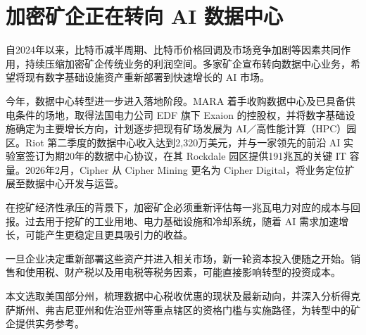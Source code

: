 \section{加密矿企正在转向 AI 数据中心}

自2024年以来，比特币减半周期、比特币价格回调及市场竞争加剧等因素共同作用，持续压缩加密矿企传统业务的利润空间。多家矿企宣布转向数据中心业务，希望将现有数字基础设施资产重新部署到快速增长的 AI 市场。

今年，数据中心转型进一步进入落地阶段。MARA 着手收购数据中心及已具备供电条件的场地，取得法国电力公司 EDF 旗下 Exaion 的控股权，并将数字基础设施确定为主要增长方向，计划逐步把现有矿场发展为 AI／高性能计算（HPC）园区。Riot 第二季度的数据中心收入达到2,320万美元，并与一家领先的前沿 AI 实验室签订为期20年的数据中心协议，在其 Rockdale 园区提供191兆瓦的关键 IT 容量。2026年2月，Cipher 从 Cipher Mining 更名为 Cipher Digital，将业务定位扩展至数据中心开发与运营。

在挖矿经济性承压的背景下，加密矿企必须重新评估每一兆瓦电力对应的成本与回报。过去用于挖矿的工业用地、电力基础设施和冷却系统，随着 AI 需求加速增长，可能产生更稳定且更具吸引力的收益。

一旦企业决定重新部署这些资产并进入相关市场，新一轮资本投入便随之开始。销售和使用税、财产税以及用电税等税务因素，可能直接影响转型的投资成本。

本文选取美国部分州，梳理数据中心税收优惠的现状及最新动向，并深入分析得克萨斯州、弗吉尼亚州和佐治亚州等重点辖区的资格门槛与实施路径，为转型中的矿企提供实务参考。

\FloatBarrier
